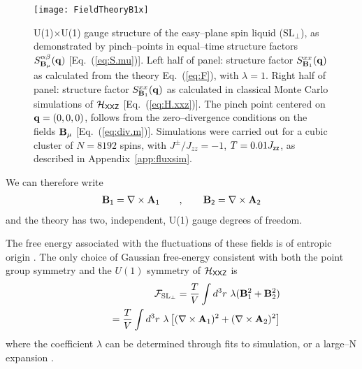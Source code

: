 \documentclass[apsrev4-1,prx,superscriptaddress,floatfix,twocolumn,longbibliography]{revtex4-1}
\begin{document}

\begin{figure}
  \centering
\texttt{[image: FieldTheoryB1x]}
  \caption{
   U(1)$\times$U(1) gauge structure of the easy--plane 
   spin liquid ($\text{SL}_\perp$), 
   as demonstrated by pinch--points in equal--time structure factors 
   $S^{\alpha\beta}_{{\bf B}_\mu} ({\bf q})$ [Eq.~(\ref{eq:S.mu})].    
   Left half of panel: structure factor $S^{xx}_{{\bf B}_1} ({\bf q})$
   as calculated from the theory Eq.~(\ref{eq:F}), with $\lambda=1$. 
   Right half of panel: structure factor $S^{xx}_{{\bf B}_1} ({\bf q})$ as calculated
   in classical Monte Carlo simulations of 
   $\mathcal{H}_{\sf XXZ}$ [Eq.~(\ref{eq:H.xxz})].  
   The pinch point centered on ${\bf q} = (0,0, 0)$, follows
   from the zero--divergence conditions on the fields ${\bf B}_\mu$ [Eq.~(\ref{eq:div.m})].   
   Simulations were carried out for a cubic cluster of $N=\text{8192}$ spins, 
   with $J^\pm/J_{zz} = -1$, $T=0.01 J_{\sf zz}$, as described in Appendix~\ref{app:fluxsim}.
    }
  \label{fig:pinch.point}
\end{figure}


We can therefore write 
%
\begin{eqnarray}
{\bf B}_{\sf 1}  =  \nabla \times{\bf A}_{\sf 1} 
\qquad , \qquad
{\bf B}_{\sf 2}  =  \nabla \times{\bf A}_{\sf 2}
\end{eqnarray}
%
and the theory has two, independent, U(1) gauge degrees of freedom. 


The free energy associated with the fluctuations of these fields is of 
entropic origin \cite{henley10}.
%
The only choice of Gaussian free-energy 
consistent with both the point group symmetry and the
$U(1)$ symmetry of $\mathcal{H}_{\sf XXZ}$ is
%
\begin{eqnarray}
&&{\mathcal F}_{\text{SL}_\perp} = \frac{T}{V} \int d^3r \
\lambda ({\bf B}_1^2+{\bf B}_2^2) \nonumber \\
&&\qquad
= \frac{T}{V} \int d^3r \
\lambda \left[(\nabla \times {\bf A}_1)^2+(\nabla \times {\bf A}_2)^2\right]
\label{eq:F}
\end{eqnarray}
%
where the coefficient $\lambda$ can be determined through fits
to simulation, or a large--N expansion \cite{Isakov2004a, benton16-NatCommun7}.  
\end{document}
